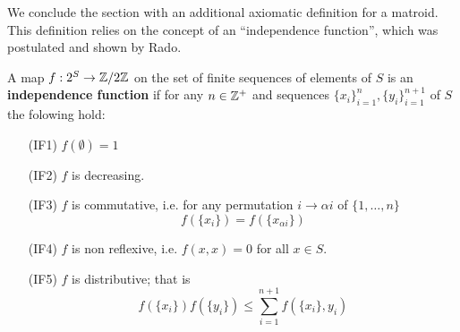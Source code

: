 We conclude the section with an additional axiomatic definition for a matroid. This definition
relies on the concept of an ``independence function'', which was postulated and shown by Rado.

\begin{definition}
    A map $f:2^S \rightarrow \mathbb{Z}/2\mathbb{Z}$ on the set of finite sequences of elements of  $S$ is an \textbf{independence
    function} if for any $n \in \mathbb{Z}^+$ and sequences  $\{x_i\}_{i=1}^{n}, \{y_i\}_{i=1}^{n+1}$ of $S$
    the folowing hold:
        \begin{enumerate}
            \item[(IF1)] $f(\emptyset)=1$

            \item[(IF2)] $f$ is decreasing.

            \item[(IF3)] $f$ is commutative, i.e. for any permutation $i \rightarrow \alpha i$ of
                $\{1,\dots, n\}$
                    \begin{equation}
                        f(\{x_i\})=f(\{x_{\alpha i}\})
                    \end{equation} 

            \item[(IF4)] $f$ is non reflexive, i.e.  $f(x,x)=0$ for all $x \in S$.

            \item[(IF5)] $f$ is distributive; that is 
                \begin{equation}
                    f(\{x_i\})f(\{y_i\}) \leq \sum_{i=1}^{n+1}{f(\{x_i\},y_i)}
                \end{equation}
        \end{enumerate}
\end{definition}

